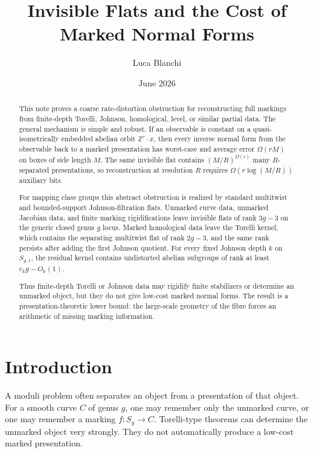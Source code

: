 \documentclass[11pt]{article}
\title{Invisible Flats and the Cost of Marked Normal Forms}
\author{Luca Blanchi}
\date{June 2026}
\begin{document}
\maketitle

\begin{abstract}
This note proves a coarse rate-distortion obstruction for reconstructing full
markings from finite-depth Torelli, Johnson, homological, level, or similar
partial data.  The general mechanism is simple and robust.  If an observable is
constant on a quasi-isometrically embedded abelian orbit
\(\mathbb Z^r\cdot x\), then every inverse normal form from the observable back
to a marked presentation has worst-case and average error \(\Omega(rM)\) on
boxes of side length \(M\).  The same invisible flat contains
\((M/R)^{\Omega(r)}\) many \(R\)-separated presentations, so reconstruction at
resolution \(R\) requires \(\Omega(r\log(M/R))\) auxiliary bits.

For mapping class groups this abstract obstruction is realized by standard
multitwist and bounded-support Johnson-filtration flats.  Unmarked curve data,
unmarked Jacobian data, and finite marking rigidifications leave invisible flats
of rank \(3g-3\) on the generic closed genus \(g\) locus.  Marked homological
data leave the Torelli kernel, which contains the separating multitwist flat of
rank \(2g-3\), and the same rank persists after adding the first Johnson
quotient.  For every fixed Johnson depth \(k\) on \(S_{g,1}\), the residual
kernel contains undistorted abelian subgroups of rank at least
\(c_k g-O_k(1)\).

Thus finite-depth Torelli or Johnson data may rigidify finite stabilizers or
determine an unmarked object, but they do not give low-cost marked normal forms.
The result is a presentation-theoretic lower bound: the large-scale geometry of
the fibre forces an arithmetic of missing marking information.
\end{abstract}

\section{Introduction}

A moduli problem often separates an object from a presentation of that object.
For a smooth curve \(C\) of genus \(g\), one may remember only the unmarked
curve, or one may remember a marking \(f:S_g\to C\).  Torelli-type theorems can
determine the unmarked object very strongly.  They do not automatically produce
a low-cost marked presentation.
\end{document}
